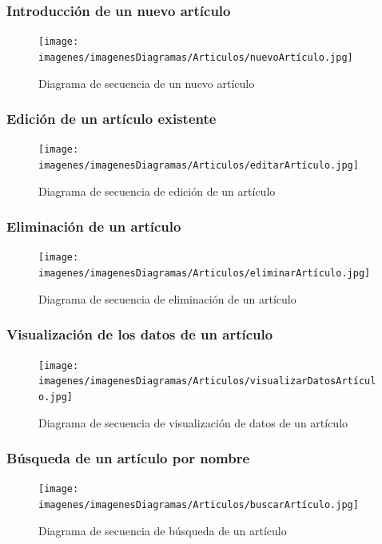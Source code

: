\subsubsection{Introducción de un nuevo artículo}

\begin{figure}[H]
	\centering
	\texttt{[image: imagenes/imagenesDiagramas/Articulos/nuevoArtículo.jpg]}
	\caption{Diagrama de secuencia de un nuevo artículo}
	\label{fig:seqdiag3}
\end{figure}

\subsubsection{Edición de un artículo existente}

\begin{figure}[H]
	\centering
	\texttt{[image: imagenes/imagenesDiagramas/Articulos/editarArtículo.jpg]}
	\caption{Diagrama de secuencia de edición de un artículo}
	\label{fig:seqdiag4}
\end{figure}

\subsubsection{Eliminación de un artículo}

\begin{figure}[H]
	\centering
	\texttt{[image: imagenes/imagenesDiagramas/Articulos/eliminarArtículo.jpg]}
	\caption{Diagrama de secuencia de eliminación de un artículo}
	\label{fig:seqdiag5}
\end{figure}

\subsubsection{Visualización de los datos de un artículo}

\begin{figure}[H]
	\centering
	\texttt{[image: imagenes/imagenesDiagramas/Articulos/visualizarDatosArtículo.jpg]}
	\caption{Diagrama de secuencia de visualización de datos de un artículo}
	\label{fig:seqdiag6}
\end{figure}

\subsubsection{Búsqueda de un artículo por nombre}

\begin{figure}[H]
	\centering
	\texttt{[image: imagenes/imagenesDiagramas/Articulos/buscarArtículo.jpg]}
	\caption{Diagrama de secuencia de búsqueda de un artículo}
	\label{fig:seqdiag7}
\end{figure}

